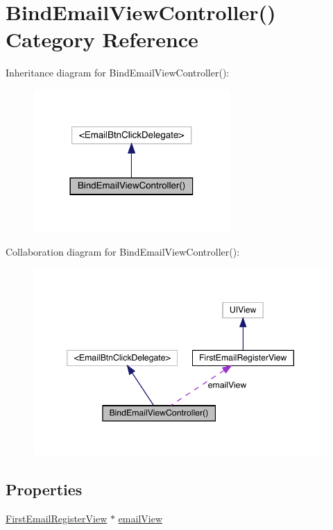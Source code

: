 \hypertarget{category_bind_email_view_controller_07_08}{}\section{Bind\+Email\+View\+Controller() Category Reference}
\label{category_bind_email_view_controller_07_08}


Inheritance diagram for Bind\+Email\+View\+Controller()\+:\nopagebreak
\begin{figure}[H]
\begin{center}
\leavevmode
\includegraphics[width=213pt]{category_bind_email_view_controller_07_08__inherit__graph}
\end{center}
\end{figure}


Collaboration diagram for Bind\+Email\+View\+Controller()\+:\nopagebreak
\begin{figure}[H]
\begin{center}
\leavevmode
\includegraphics[width=346pt]{category_bind_email_view_controller_07_08__coll__graph}
\end{center}
\end{figure}
\subsection*{Properties}
\begin{DoxyCompactItemize}
\item 
\mbox{\hyperlink{interface_first_email_register_view}{First\+Email\+Register\+View}} $\ast$ \mbox{\hyperlink{category_bind_email_view_controller_07_08_a96d91f4d195d637b2360fcc82e7333bc}{email\+View}}
\end{DoxyCompactItemize}


